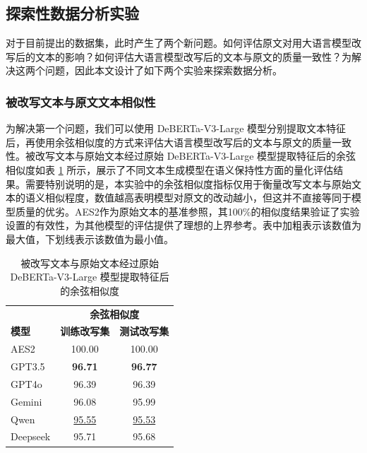 \subsection{探索性数据分析实验}
\label{sec:method-experiment-analysis}

对于目前提出的数据集，此时产生了两个新问题。如何评估原文对用大语言模型改写后的文本的影响？如何评估大语言模型改写后的文本与原文的质量一致性？为解决这两个问题，因此本文设计了如下两个实验来探索数据分析。

\subsubsection{被改写文本与原文文本相似性}

为解决第一个问题，我们可以使用 DeBERTa-V3-Large 模型分别提取文本特征后，再使用余弦相似度的方式来评估大语言模型改写后的文本与原文的质量一致性。被改写文本与原始文本经过原始 DeBERTa-V3-Large 模型提取特征后的余弦相似度如表 \ref{tab:cos} 所示，展示了不同文本生成模型在语义保持性方面的量化评估结果。需要特别说明的是，本实验中的余弦相似度指标仅用于衡量改写文本与原始文本的语义相似程度，数值越高表明模型对原文的改动越小，但这并不直接等同于模型质量的优劣。AES2作为原始文本的基准参照，其100\%的相似度结果验证了实验设置的有效性，为其他模型的评估提供了理想的上界参考。表中加粗表示该数值为最大值，下划线表示该数值为最小值。

\begin{table}[htbp]
\centering
\caption{被改写文本与原始文本经过原始 DeBERTa-V3-Large 模型提取特征后的余弦相似度}
\begin{tabular}{l|c|c}
\toprule
         & \multicolumn{2}{c}{\textbf{余弦相似度}} \\
\textbf{模型} & \textbf{训练改写集}      & \textbf{测试改写集}    \\ \midrule
AES2 \cite{learning-agency-lab-automated-essay-scoring-2}    & 100.00                 & 100.00                \\
GPT3.5 \cite{chatgpt}  & \textbf{96.71}         & \textbf{96.77}        \\
GPT4o \cite{gpt4o}   & 96.39                  & 96.39                 \\
Gemini \cite{geminiteam2024geminifamilyhighlycapable}  & 96.08                  & 95.99                 \\
Qwen \cite{qwen2025qwen25technicalreport}    & \uline{95.55}          & \uline{95.53}         \\
Deepseek \cite{deepseekai2024deepseekv3technicalreport} & 95.71                  & 95.68                 \\ \bottomrule
\end{tabular}
\label{tab:cos}
\end{table}

